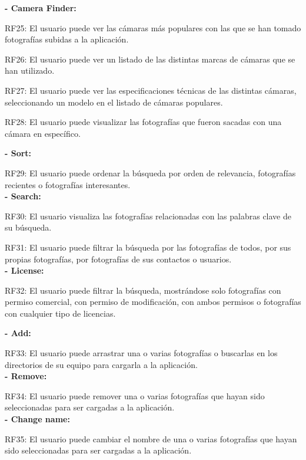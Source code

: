 \documentclass{memoria}
\begin{document}
\textbf{- Camera Finder:}

RF25: El usuario puede ver las cámaras más populares con las que se han tomado fotografías subidas a la aplicación.

RF26: El usuario puede ver un listado de las distintas marcas de cámaras que se han utilizado.

RF27: El usuario puede ver las especificaciones técnicas de las distintas cámaras, seleccionando un modelo en el listado de cámaras populares.

RF28: El usuario puede visualizar las fotografías que fueron sacadas con una cámara en específico.\\


\textbf{- Sort:} 

RF29: El usuario puede ordenar la búsqueda por orden de relevancia, fotografías recientes o fotografías interesantes.\\

\textbf{- Search:}

RF30: El usuario visualiza las fotografías relacionadas con las palabras clave de su búsqueda.

RF31: El usuario puede filtrar la búsqueda por las fotografías de todos, por sus propias fotografías, por fotografías de sus contactos o usuarios.\\

\textbf{- License:}

RF32: El usuario puede filtrar la búsqueda, mostrándose solo fotografías con permiso comercial, con permiso de modificación, con ambos permisos o fotografías con cualquier tipo de licencias.\\


\textbf{- Add:}

RF33: El usuario puede arrastrar una o varias fotografías o buscarlas en los directorios de su equipo para cargarla a la aplicación.\\

\textbf{- Remove:} 

RF34: El usuario puede remover una o varias fotografías que hayan sido seleccionadas para ser cargadas a la aplicación.\\ 

\textbf{- Change name:}

RF35: El usuario puede cambiar el nombre de una o varias fotografías que hayan sido seleccionadas para ser cargadas a la aplicación.\\
\end{document}
